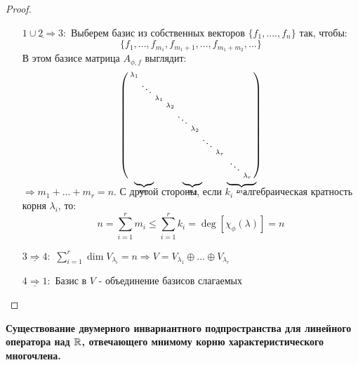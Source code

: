 \begin{proof}
\begin{itemize}
            \item[$\underline{1 \cup 2 \Rightarrow  3}:$] Выберем базис из собственных векторов $\{f_1,....,f_n\}$ так, чтобы: 
            $$\{f_1,...,f_{m_1},f_{m_1+1},...,f_{m_1+m_2},...\}$$
            В этом базисе матрица $A_{\phi, f}$ выглядит:
            \setcounter{MaxMatrixCols}{20}
            $$\left(\begin{smallmatrix}
                \lambda_1\\
                \null & \ddots \\
                \null & \null & \lambda_1 \\
                \null & \null & \null & \lambda_2 \\
                \null & \null & \null & \null & \ddots \\
                \null & \null & \null & \null & \null & \lambda_2 \\
                \null & \null & \null & \null & \null & \null & \ddots \\
                \null & \null & \null & \null & \null & \null & \null & \lambda_r \\
                \null & \null & \null & \null & \null & \null & \null & \null & \null & \ddots \\
                \undermat{m_1}{\null & \null & \null} & \null& \undermat{m_2}{\null & \null & \null} & \null & \undermat{m_r}{\null & \null & \lambda_r} \\
            \end{smallmatrix}\right) \vspace{0.7cm} $$ 
            $\Longrightarrow m_1+...+m_r = n$. С другой стороны, если $k_i$ - алгебраическая кратность корня $\lambda_i$, то:
            $$n = \sum \limits_{i=1}^r m_i \leq \sum \limits_{i=1}^rk_i = \deg [\chi_\phi(\lambda)] = n$$
            \item[$\underline{3 \Rightarrow 4}:$] $\sum \limits_{i=1}^r\dim V_{\lambda_i} = n \Longrightarrow V = V_{\lambda_1} \oplus ... \oplus V_{\lambda_r}$

            \item[$\underline{4 \Rightarrow  1}:$] Базис в $V$ - объединение базисов слагаемых 
        \end{itemize}
    \end{proof}
    
    \textbf{Существование двумерного инвариантного подпространства для линейного оператора над $\mathbb{R}$, отвечающего мнимому корню характеристического многочлена.}
    
